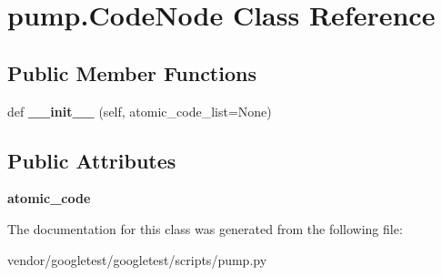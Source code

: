 \hypertarget{classpump_1_1CodeNode}{}\section{pump.\+Code\+Node Class Reference}
\label{classpump_1_1CodeNode}
\subsection*{Public Member Functions}
\begin{DoxyCompactItemize}
\item 
def {\bfseries \+\_\+\+\_\+init\+\_\+\+\_\+} (self, atomic\+\_\+code\+\_\+list=None)\hypertarget{classpump_1_1CodeNode_a2ca8a75324a64e48004812d6c0bc1cbd}{}\label{classpump_1_1CodeNode_a2ca8a75324a64e48004812d6c0bc1cbd}

\end{DoxyCompactItemize}
\subsection*{Public Attributes}
\begin{DoxyCompactItemize}
\item 
{\bfseries atomic\+\_\+code}\hypertarget{classpump_1_1CodeNode_ac7251110cc987c709e0e17d95521993e}{}\label{classpump_1_1CodeNode_ac7251110cc987c709e0e17d95521993e}

\end{DoxyCompactItemize}


The documentation for this class was generated from the following file\+:\begin{DoxyCompactItemize}
\item 
vendor/googletest/googletest/scripts/pump.\+py\end{DoxyCompactItemize}
